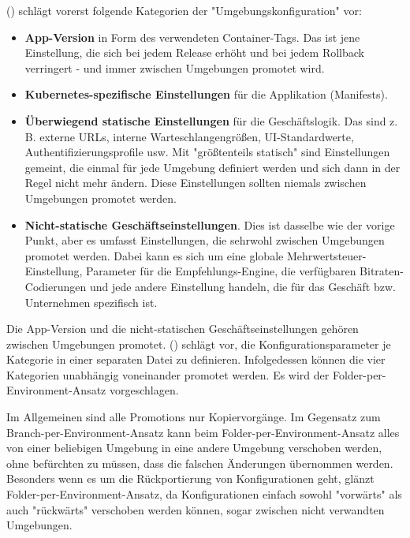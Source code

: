 \citeauthor{codefreshHowToModelGitOpsEnvironmentsAndPromote} (\citeyear{codefreshHowToModelGitOpsEnvironmentsAndPromote})
schlägt vorerst folgende Kategorien der "Umgebungskonfiguration" vor:

\begin{itemize}
    \item \textbf{App-Version} in Form des verwendeten Container-Tags. Das ist jene Einstellung, die sich bei jedem Release erhöht und bei jedem Rollback verringert - und immer zwischen Umgebungen promotet wird.
    \item \textbf{Kubernetes-spezifische Einstellungen} für die Applikation (Manifests).
    \item \textbf{Überwiegend statische Einstellungen} für die Geschäftslogik. Das sind z. B. externe URLs, interne Warteschlangengrößen, UI-Standardwerte, Authentifizierungsprofile usw. Mit "größtenteils statisch" sind Einstellungen gemeint, die einmal für jede Umgebung definiert werden und sich dann in der Regel nicht mehr ändern. Diese Einstellungen sollten niemals zwischen Umgebungen promotet werden.
    \item \textbf{Nicht-statische Geschäftseinstellungen}. Dies ist dasselbe wie der vorige Punkt, aber es umfasst Einstellungen, die sehrwohl zwischen Umgebungen promotet werden. Dabei kann es sich um eine globale Mehrwertsteuer-Einstellung, Parameter für die Empfehlungs-Engine, die verfügbaren Bitraten-Codierungen und jede andere Einstellung handeln, die für das Geschäft bzw. Unternehmen spezifisch ist.
\end{itemize}

Die App-Version und die nicht-statischen Geschäftseinstellungen gehören zwischen Umgebungen promotet.
\citeauthor{codefreshHowToModelGitOpsEnvironmentsAndPromote} (\citeyear{codefreshHowToModelGitOpsEnvironmentsAndPromote})
schlägt vor, die Konfigurationsparameter je Kategorie in einer separaten Datei zu definieren.
Infolgedessen können die vier Kategorien unabhängig voneinander promotet werden.
Es wird der Folder-per-Environment-Ansatz vorgeschlagen.


Im Allgemeinen sind alle Promotions nur Kopiervorgänge. 
Im Gegensatz zum Branch-per-Environment-Ansatz kann beim Folder-per-Environment-Ansatz 
alles von einer beliebigen Umgebung in eine andere Umgebung verschoben werden, 
ohne befürchten zu müssen, dass die falschen Änderungen übernommen werden. 
Besonders wenn es um die Rückportierung von Konfigurationen geht, glänzt Folder-per-Environment-Ansatz, 
da Konfigurationen einfach sowohl "vorwärts" als auch "rückwärts" verschoben werden können, 
sogar zwischen nicht verwandten Umgebungen.
\bigskip

